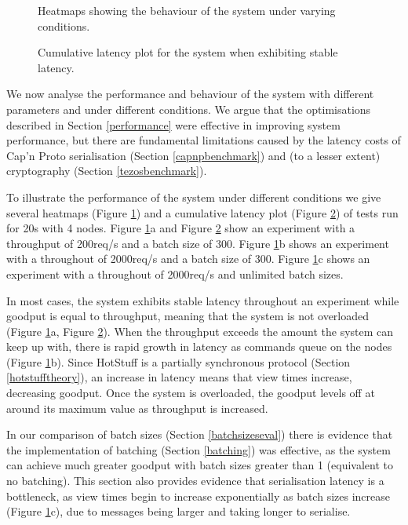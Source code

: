 \begin{figure}[h!]
\centering
\resizebox{.8\textwidth}{!}{}
\caption{Heatmaps showing the behaviour of the system under varying conditions.}
\label{heatmaps}
\end{figure}

\begin{figure}[h!]
\centering
\resizebox{.6\textwidth}{!}{}
\caption{Cumulative latency plot for the system when exhibiting stable latency.}
\label{ecdfstable}
\end{figure}

We now analyse the performance and behaviour of the system with different parameters and under different conditions. We argue that the optimisations described in Section \ref{performance} were effective in improving system performance, but there are fundamental limitations caused by the latency costs of Cap'n Proto serialisation (Section \ref{capnpbenchmark}) and (to a lesser extent) cryptography (Section \ref{tezosbenchmark}).

To illustrate the performance of the system under different conditions we give several heatmaps (Figure \ref{heatmaps}) and a cumulative latency plot (Figure \ref{ecdfstable}) of tests run for 20s with 4 nodes. Figure \ref{heatmaps}a and Figure \ref{ecdfstable} show an experiment with a throughput of 200req/s and a batch size of 300. Figure \ref{heatmaps}b shows an experiment with a throughout of 2000req/s and a batch size of 300. Figure \ref{heatmaps}c shows an experiment with a throughout of 2000req/s and unlimited batch sizes.

In most cases, the system exhibits stable latency throughout an experiment while goodput is equal to throughput, meaning that the system is not overloaded (Figure \ref{heatmaps}a, Figure \ref{ecdfstable}). When the throughput exceeds the amount the system can keep up with, there is rapid growth in latency as commands queue on the nodes (Figure \ref{heatmaps}b). Since HotStuff is a partially synchronous protocol (Section \ref{hotstufftheory}), an increase in latency means that view times increase, decreasing goodput. Once the system is overloaded, the goodput levels off at around its maximum value as throughput is increased.

In our comparison of batch sizes (Section \ref{batchsizeseval}) there is evidence that the implementation of batching (Section \ref{batching}) was effective, as the system can achieve much greater goodput with batch sizes greater than 1 (equivalent to no batching). This section also provides evidence that serialisation latency is a bottleneck, as view times begin to increase exponentially as batch sizes increase (Figure \ref{heatmaps}c), due to messages being larger and taking longer to serialise.

